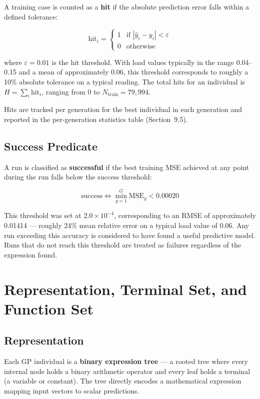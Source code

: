 \documentclass[12pt,a4paper]{article}
\begin{document}
A training case is counted as a \textbf{hit} if the absolute prediction error falls within a defined tolerance:

\[
\text{hit}_i = \begin{cases} 1 & \text{if } |\hat{y}_i - y_i| < \varepsilon \\ 0 & \text{otherwise} \end{cases}
\]

where $\varepsilon = 0.01$ is the hit threshold. With load values typically in the range 0.04--0.15 and a mean of approximately 0.06, this threshold corresponds to roughly a 10\% absolute tolerance on a typical reading. The total hits for an individual is $H = \sum_i \text{hit}_i$, ranging from 0 to $N_{\text{train}} = 79{,}994$.

Hits are tracked per generation for the best individual in each generation and reported in the per-generation statistics table (Section~9.5).

\subsection*{Success Predicate}

A run is classified as \textbf{successful} if the best training MSE achieved at any point during the run falls below the success threshold:

\[
\text{success} \iff \min_{g=1}^{G} \text{MSE}_g < 0.00020
\]

This threshold was set at $2.0 \times 10^{-4}$, corresponding to an RMSE of approximately 0.01414 --- roughly 24\% mean relative error on a typical load value of 0.06. Any run exceeding this accuracy is considered to have found a useful predictive model. Runs that do not reach this threshold are treated as failures regardless of the expression found.

\section{Representation, Terminal Set, and Function Set}

\subsection{Representation}

Each GP individual is a \textbf{binary expression tree} --- a rooted tree where every internal node holds a binary arithmetic operator and every leaf holds a terminal (a variable or constant). The tree directly encodes a mathematical expression mapping input vectors to scalar predictions.
\end{document}
